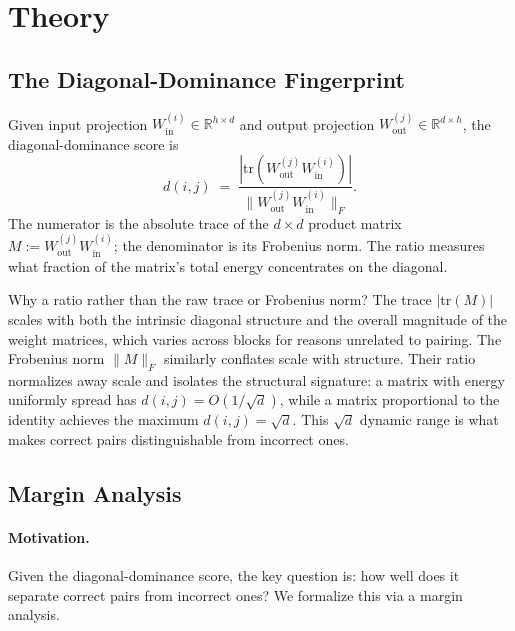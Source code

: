 \documentclass[wcp]{jmlr}
\begin{document}
\section{Theory}\label{sec:theory}

\subsection{The Diagonal-Dominance Fingerprint}\label{sec:dd-score}

Given input projection $W_{\mathrm{in}}^{(i)} \in \mathbb{R}^{h \times d}$ and output projection $W_{\mathrm{out}}^{(j)} \in \mathbb{R}^{d \times h}$, the diagonal-dominance score is
\begin{equation}\label{eq:dd-score}
  d(i,j) \;=\; \frac{|\mathrm{tr}(W_{\mathrm{out}}^{(j)} W_{\mathrm{in}}^{(i)})|}{\|W_{\mathrm{out}}^{(j)} W_{\mathrm{in}}^{(i)}\|_F}.
\end{equation}
The numerator is the absolute trace of the $d \times d$ product matrix $M := W_{\mathrm{out}}^{(j)} W_{\mathrm{in}}^{(i)}$; the denominator is its Frobenius norm. The ratio measures what fraction of the matrix's total energy concentrates on the diagonal.

Why a ratio rather than the raw trace or Frobenius norm? The trace $|\mathrm{tr}(M)|$ scales with both the intrinsic diagonal structure and the overall magnitude of the weight matrices, which varies across blocks for reasons unrelated to pairing. The Frobenius norm $\|M\|_F$ similarly conflates scale with structure. Their ratio normalizes away scale and isolates the structural signature: a matrix with energy uniformly spread has $d(i,j) = O(1/\sqrt{d})$, while a matrix proportional to the identity achieves the maximum $d(i,j) = \sqrt{d}$. This $\sqrt{d}$ dynamic range is what makes correct pairs distinguishable from incorrect ones.

\subsection{Margin Analysis}\label{sec:margin-analysis}

\paragraph{Motivation.} Given the diagonal-dominance score, the key question is: how well does it separate correct pairs from incorrect ones? We formalize this via a margin analysis.
\end{document}
